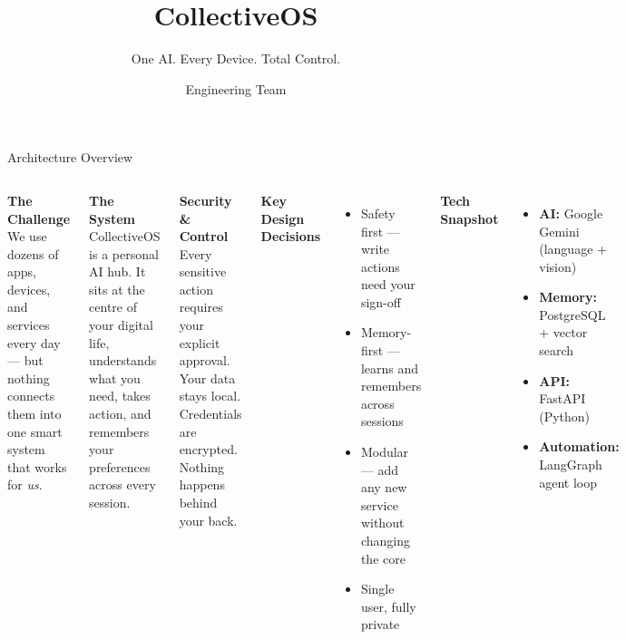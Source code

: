 \documentclass[aspectratio=169,11pt]{beamer}
\title{CollectiveOS}
\subtitle{One AI. Every Device. Total Control.}
\author{Engineering Team}
\date{\the\year}
\begin{document}
\begin{frame}[plain]
  \titlepage
\end{frame}


\begin{frame}{Architecture Overview}
  \begin{columns}[T]

    \textbf{\color{accentcol}The Challenge}\\[0.3em]
    {\small We use dozens of apps, devices, and services every day —
    but nothing connects them into one smart system that works for \emph{us}.}

    \vspace{1em}
    \textbf{\color{accentcol}The System}\\[0.3em]
    {\small CollectiveOS is a personal AI hub. It sits at the centre of your
    digital life, understands what you need, takes action, and remembers
    your preferences across every session.}

    \vspace{1em}
    \textbf{\color{accentcol}Security \& Control}\\[0.3em]
    {\small Every sensitive action requires your explicit approval.
    Your data stays local. Credentials are encrypted. Nothing happens
    behind your back.}

    \textbf{\color{accentcol}Key Design Decisions}
    \begin{itemize}\small
      \item Safety first — write actions need your sign-off
      \item Memory-first — learns and remembers across sessions
      \item Modular — add any new service without changing the core
      \item Single user, fully private
    \end{itemize}

    \vspace{0.8em}
    \textbf{\color{accentcol}Tech Snapshot}
    \begin{itemize}\small
      \item \textbf{AI:} Google Gemini (language + vision)
      \item \textbf{Memory:} PostgreSQL + vector search
      \item \textbf{API:} FastAPI (Python)
      \item \textbf{Automation:} LangGraph agent loop
    \end{itemize}


\end{columns}
\end{frame}
\end{document}
